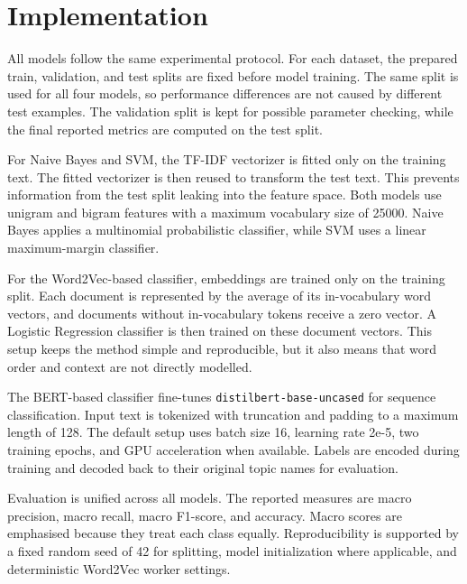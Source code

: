 \section{Implementation}

All models follow the same experimental protocol. For each dataset, the prepared train, validation, and test splits are fixed before model training. The same split is used for all four models, so performance differences are not caused by different test examples. The validation split is kept for possible parameter checking, while the final reported metrics are computed on the test split.

For Naive Bayes and SVM, the TF-IDF vectorizer is fitted only on the training text. The fitted vectorizer is then reused to transform the test text. This prevents information from the test split leaking into the feature space. Both models use unigram and bigram features with a maximum vocabulary size of 25000. Naive Bayes applies a multinomial probabilistic classifier, while SVM uses a linear maximum-margin classifier.

For the Word2Vec-based classifier, embeddings are trained only on the training split. Each document is represented by the average of its in-vocabulary word vectors, and documents without in-vocabulary tokens receive a zero vector. A Logistic Regression classifier is then trained on these document vectors. This setup keeps the method simple and reproducible, but it also means that word order and context are not directly modelled.

The BERT-based classifier fine-tunes \texttt{distilbert-base-uncased} for sequence classification. Input text is tokenized with truncation and padding to a maximum length of 128. The default setup uses batch size 16, learning rate 2e-5, two training epochs, and GPU acceleration when available. Labels are encoded during training and decoded back to their original topic names for evaluation.

Evaluation is unified across all models. The reported measures are macro precision, macro recall, macro F1-score, and accuracy. Macro scores are emphasised because they treat each class equally. Reproducibility is supported by a fixed random seed of 42 for splitting, model initialization where applicable, and deterministic Word2Vec worker settings.

